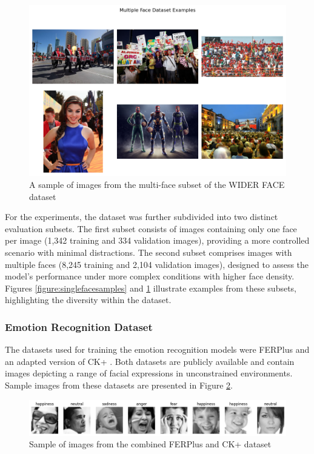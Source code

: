 \begin{figure}[!htb]
    \centering{}
    \includegraphics[scale=0.35]{m+m_images/multi_face_figure_samples.png}
    \caption{A sample of images from the multi-face subset of the WIDER FACE dataset}
    \label{figure:multifacesamples}
\end{figure}

For the experiments, the dataset was further subdivided into two distinct evaluation subsets. The first subset consists of images containing only one face per image (1,342 training and 334 validation images), providing a more controlled scenario with minimal distractions. The second subset comprises images with multiple faces (8,245 training and 2,104 validation images), designed to assess the model's performance under more complex conditions with higher face density. Figures \ref{figure:singlefacesamples} and \ref{figure:multifacesamples} illustrate examples from these subsets, highlighting the diversity within the dataset.

\subsubsection{Emotion Recognition Dataset}

The datasets used for training the emotion recognition models were FERPlus \cite{BarsoumICMI2016} and an adapted version of CK+ \cite{5543262}. Both datasets are publicly available and contain images depicting a range of facial expressions in unconstrained environments. Sample images from these datasets are presented in Figure \ref{figure:sample_imgs}.

\begin{figure}[!htb]
    \centering
    \includegraphics[scale=0.5]{m+m_images/random_imgs.png}
    \caption{Sample of images from the combined FERPlus and CK+ dataset}
    \label{figure:sample_imgs}
\end{figure}

